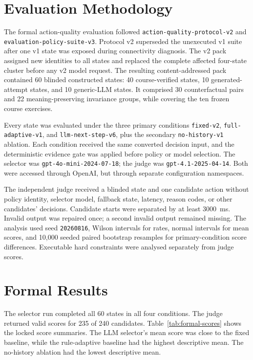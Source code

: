 \documentclass[final-report]{../project-plan/report-template}
\begin{document}
\section{Evaluation Methodology}

The formal action-quality evaluation followed
\texttt{action-quality-protocol-v2} and
\texttt{evaluation-policy-suite-v3}. Protocol v2 superseded the unexecuted v1
suite after one v1 state was exposed during connectivity diagnosis. The v2 pack
assigned new identities to all states and replaced the complete affected
four-state cluster before any v2 model request. The resulting content-addressed
pack contained 60 blinded constructed states: 40 course-verified states, 10
generated-attempt states, and 10 generic-LLM states. It comprised 30
counterfactual pairs and 22 meaning-preserving invariance groups, while covering
the ten frozen course exercises.

Every state was evaluated under the three primary conditions
\texttt{fixed-v2}, \texttt{full-adaptive-v1}, and
\texttt{llm-next-step-v6}, plus the secondary \texttt{no-history-v1}
ablation. Each condition received the same converted decision input, and the
deterministic evidence gate was applied before policy or model selection. The
selector was \texttt{gpt-4o-mini-2024-07-18}; the judge was
\texttt{gpt-4.1-2025-04-14}. Both were accessed through OpenAI, but through
separate configuration namespaces.

The independent judge received a blinded state and one candidate action without
policy identity, selector model, fallback state, latency, reason codes, or other
candidates' decisions. Candidate starts were separated by at least 3000~ms.
Invalid output was repaired once; a second invalid output remained missing.
The analysis used seed \texttt{20260816}, Wilson intervals for rates, normal
intervals for mean scores, and 10,000 seeded paired bootstrap resamples for
primary-condition score differences. Executable hard constraints were analysed
separately from judge scores.

\section{Formal Results}

The selector run completed all 60 states in all four conditions. The judge
returned valid scores for 235 of 240 candidates. Table~\ref{tab:formal-scores}
shows the locked score summaries. The LLM selector's mean score was close to the
fixed baseline, while the rule-adaptive baseline had the highest descriptive
mean. The no-history ablation had the lowest descriptive mean.
\end{document}
